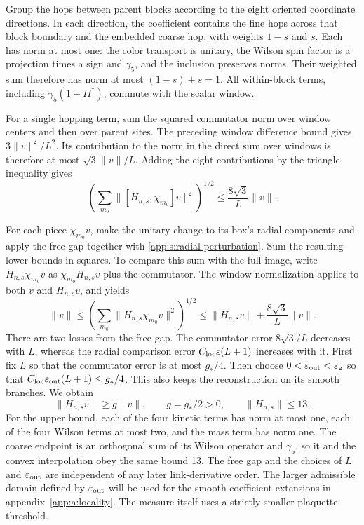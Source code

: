 \documentclass[11pt,a4paper]{article}
\theoremstyle{remark}
\newcommand{\eps}{\varepsilon}
\begin{document}
Group the hops between parent blocks according to the eight oriented
coordinate directions. In each direction, the coefficient contains the
fine hops across that block boundary and the embedded coarse hop, with
weights $1-s$ and $s$. Each has norm at most one: the color transport
is unitary, the Wilson spin factor is a projection times a sign and
$\gamma_5$, and the inclusion preserves norms. Their weighted sum
therefore has norm at most $(1-s)+s=1$. All within-block terms,
including $\gamma_5(1-II^\dagger)$, commute with the scalar window.

For a single hopping term, sum the squared commutator norm over window
centers and then over parent sites. The preceding window difference
bound gives $3\|v\|^2/L^2$. Its contribution to the norm in the
direct sum over windows is therefore at most $\sqrt3\|v\|/L$.
Adding the eight contributions by the triangle inequality gives
\begin{equation}
 \left(\sum_{m_0}\|[H_{n,s},\chi_{m_0}]v\|^2\right)^{1/2}
       \le \frac{8\sqrt3}{L}\|v\|.
\end{equation}

For each piece $\chi_{m_0}v$, make the unitary change to its box's
radial components and apply the free gap together with
\eqref{app:s:radial-perturbation}. Sum the resulting lower bounds in
squares. To compare this sum with the full image, write
$H_{n,s}\chi_{m_0}v$ as $\chi_{m_0}H_{n,s}v$ plus the
commutator. The window normalization applies to both $v$ and
$H_{n,s}v$, and yields
\begin{equation}
 [g_*-C_{\rm loc}\eps(L+1)]\|v\|
 \le\left(\sum_{m_0}\|H_{n,s}\chi_{m_0}v\|^2\right)^{1/2}
 \le\|H_{n,s}v\|+\frac{8\sqrt3}{L}\|v\|.
\end{equation}
There are two losses from the free gap. The commutator error
$8\sqrt3/L$ decreases with $L$, whereas the radial comparison error
$C_{\rm loc}\eps(L+1)$ increases with it. First fix $L$ so that
the commutator error is at most $g_*/4$. Then choose
$0<\eps_{\rm out}<\eps_{\rm g}$ so that
$C_{\rm loc}\eps_{\rm out}(L+1)\le g_*/4$. This also keeps the
reconstruction on its smooth branches. We obtain
\begin{equation}
 \|H_{n,s}v\|\ge g\|v\|,\qquad
 g=g_*/2>0,\qquad \|H_{n,s}\|\le13.
 \label{app:s:gap}
\end{equation}
For the upper bound, each of the four kinetic terms has norm at most
one, each of the four Wilson terms at most two, and the mass term has
norm one. The coarse endpoint is an orthogonal sum of its Wilson
operator and $\gamma_5$, so it and the convex interpolation obey the
same bound 13. The free gap and the choices of $L$ and
$\eps_{\rm out}$ are independent of any later link-derivative order.
The larger admissible domain defined by $\eps_{\rm out}$ will be
used for the smooth coefficient extensions in
appendix~\ref{app:a:locality}. The measure itself uses a strictly
smaller plaquette threshold.
\end{document}

